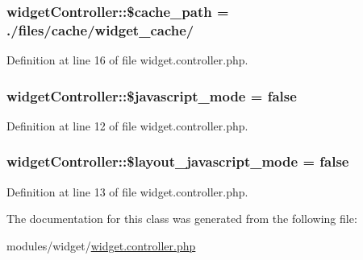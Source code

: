 \subsubsection[{\$cache\+\_\+path}]{\setlength{\rightskip}{0pt plus 5cm}widget\+Controller\+::\$cache\+\_\+path = \textquotesingle{}./files/cache/widget\+\_\+cache/\textquotesingle{}}\label{classwidgetController_a279375b189444d13250d8111910655c3}


Definition at line 16 of file widget.\+controller.\+php.

\hypertarget{classwidgetController_a9879a9de581b205ffa63cc0297dcefab}{}
\subsubsection[{\$javascript\+\_\+mode}]{\setlength{\rightskip}{0pt plus 5cm}widget\+Controller\+::\$javascript\+\_\+mode = false}\label{classwidgetController_a9879a9de581b205ffa63cc0297dcefab}


Definition at line 12 of file widget.\+controller.\+php.

\hypertarget{classwidgetController_ab123ebb549e616c6e67bf79e73f56ac8}{}
\subsubsection[{\$layout\+\_\+javascript\+\_\+mode}]{\setlength{\rightskip}{0pt plus 5cm}widget\+Controller\+::\$layout\+\_\+javascript\+\_\+mode = false}\label{classwidgetController_ab123ebb549e616c6e67bf79e73f56ac8}


Definition at line 13 of file widget.\+controller.\+php.



The documentation for this class was generated from the following file\+:\begin{DoxyCompactItemize}
\item 
modules/widget/\hyperlink{widget_8controller_8php}{widget.\+controller.\+php}\end{DoxyCompactItemize}
